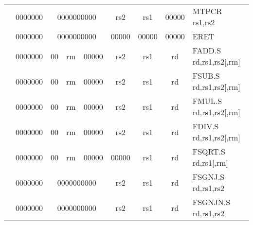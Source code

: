 \begin{table}[p]
\begin{small}
\begin{center}
\begin{tabular}{rcccccccccl}
&
\multicolumn{1}{|c|}{0000000} &
\multicolumn{5}{c|}{0000000000} &
\multicolumn{1}{c|}{rs2} &
\multicolumn{1}{c|}{rs1} &
\multicolumn{1}{c|}{00000} & MTPCR rs1,rs2 \\
\cline{2-10}
  

&
\multicolumn{1}{|c|}{0000000} &
\multicolumn{5}{c|}{0000000000} &
\multicolumn{1}{c|}{00000} &
\multicolumn{1}{c|}{00000} &
\multicolumn{1}{c|}{00000} & ERET  \\
\cline{2-10}
  

&
\multicolumn{1}{|c|}{0000000} &
\multicolumn{1}{c|}{00} &
\multicolumn{2}{c|}{rm} &
\multicolumn{2}{c|}{00000} &
\multicolumn{1}{c|}{rs2} &
\multicolumn{1}{c|}{rs1} &
\multicolumn{1}{c|}{rd} & FADD.S rd,rs1,rs2[,rm] \\
\cline{2-10}
  

&
\multicolumn{1}{|c|}{0000000} &
\multicolumn{1}{c|}{00} &
\multicolumn{2}{c|}{rm} &
\multicolumn{2}{c|}{00000} &
\multicolumn{1}{c|}{rs2} &
\multicolumn{1}{c|}{rs1} &
\multicolumn{1}{c|}{rd} & FSUB.S rd,rs1,rs2[,rm] \\
\cline{2-10}
  

&
\multicolumn{1}{|c|}{0000000} &
\multicolumn{1}{c|}{00} &
\multicolumn{2}{c|}{rm} &
\multicolumn{2}{c|}{00000} &
\multicolumn{1}{c|}{rs2} &
\multicolumn{1}{c|}{rs1} &
\multicolumn{1}{c|}{rd} & FMUL.S rd,rs1,rs2[,rm] \\
\cline{2-10}
  

&
\multicolumn{1}{|c|}{0000000} &
\multicolumn{1}{c|}{00} &
\multicolumn{2}{c|}{rm} &
\multicolumn{2}{c|}{00000} &
\multicolumn{1}{c|}{rs2} &
\multicolumn{1}{c|}{rs1} &
\multicolumn{1}{c|}{rd} & FDIV.S rd,rs1,rs2[,rm] \\
\cline{2-10}
  

&
\multicolumn{1}{|c|}{0000000} &
\multicolumn{1}{c|}{00} &
\multicolumn{2}{c|}{rm} &
\multicolumn{2}{c|}{00000} &
\multicolumn{1}{c|}{00000} &
\multicolumn{1}{c|}{rs1} &
\multicolumn{1}{c|}{rd} & FSQRT.S rd,rs1[,rm] \\
\cline{2-10}
  

&
\multicolumn{1}{|c|}{0000000} &
\multicolumn{5}{c|}{0000000000} &
\multicolumn{1}{c|}{rs2} &
\multicolumn{1}{c|}{rs1} &
\multicolumn{1}{c|}{rd} & FSGNJ.S rd,rs1,rs2 \\
\cline{2-10}
  

&
\multicolumn{1}{|c|}{0000000} &
\multicolumn{5}{c|}{0000000000} &
\multicolumn{1}{c|}{rs2} &
\multicolumn{1}{c|}{rs1} &
\multicolumn{1}{c|}{rd} & FSGNJN.S rd,rs1,rs2 \\
\cline{2-10}
  


\end{tabular}
\end{center}
\end{small}
\end{table}
